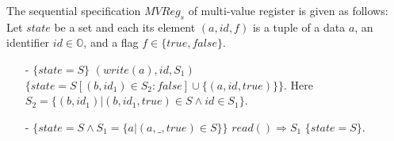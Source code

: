 \begin{example}
\label{definition:sequential specification of multi-value register}
The sequential specification $\mathit{MVReg}_s$ of multi-value register is given as follows: Let $\mathit{state}$ be a set and each its element $(a,\mathit{id},f)$ is a tuple of a data $a$, an identifier $\mathit{id} \in \mathbb{O}$, and a flag $f \in \{ \mathit{true},\mathit{false} \}$.
\begin{itemize}
\setlength{\itemsep}{0.5pt}
\item[-] $\{ \mathit{state} = S \}$ $(write(a),\mathit{id},S_1)$ $\{ \mathit{state} = S[(b,\mathit{id}_1) \in S_2 : \mathit{false}]
\cup
\{ (a,id,\mathit{true}) \}
\}$. Here $S_2 = \{ (b,\mathit{id}_1) \vert (b,\mathit{id}_1,\mathit{true}) \in S \wedge id \in S_1 \}$.
\item[-] $\{ \mathit{state} = S \wedge S_1 = \{ a \vert (a,\_,\mathit{true}) \in S \} \}$ $read() \Rightarrow S_1$ $\{ \mathit{state} = S \}$.
\end{itemize}
\end{example}




